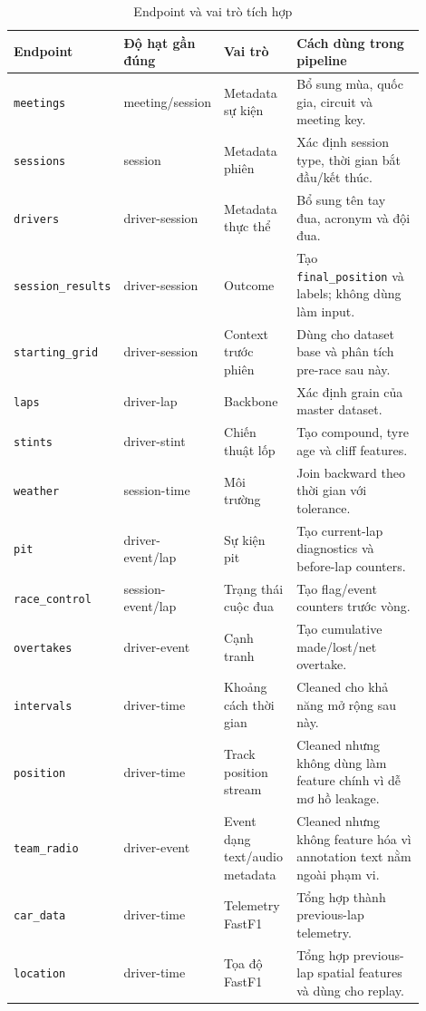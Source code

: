 \documentclass[conference]{IEEEtran}
\begin{document}
\begin{table}[htbp]
\caption{Endpoint và vai trò tích hợp}
\label{tab:endpoints}
\centering
\begin{tabular}{p{0.16\linewidth}p{0.18\linewidth}p{0.18\linewidth}p{0.38\linewidth}}
\toprule
Endpoint & Độ hạt gần đúng & Vai trò & Cách dùng trong pipeline \\
\midrule
\texttt{meetings} & meeting/session & Metadata sự kiện & Bổ sung mùa, quốc gia, circuit và meeting key. \\
\texttt{sessions} & session & Metadata phiên & Xác định session type, thời gian bắt đầu/kết thúc. \\
\texttt{drivers} & driver-session & Metadata thực thể & Bổ sung tên tay đua, acronym và đội đua. \\
\texttt{session\_results} & driver-session & Outcome & Tạo \texttt{final\_position} và labels; không dùng làm input. \\
\texttt{starting\_grid} & driver-session & Context trước phiên & Dùng cho dataset base và phân tích pre-race sau này. \\
\texttt{laps} & driver-lap & Backbone & Xác định grain của master dataset. \\
\texttt{stints} & driver-stint & Chiến thuật lốp & Tạo compound, tyre age và cliff features. \\
\texttt{weather} & session-time & Môi trường & Join backward theo thời gian với tolerance. \\
\texttt{pit} & driver-event/lap & Sự kiện pit & Tạo current-lap diagnostics và before-lap counters. \\
\texttt{race\_control} & session-event/lap & Trạng thái cuộc đua & Tạo flag/event counters trước vòng. \\
\texttt{overtakes} & driver-event & Cạnh tranh & Tạo cumulative made/lost/net overtake. \\
\texttt{intervals} & driver-time & Khoảng cách thời gian & Cleaned cho khả năng mở rộng sau này. \\
\texttt{position} & driver-time & Track position stream & Cleaned nhưng không dùng làm feature chính vì dễ mơ hồ leakage. \\
\texttt{team\_radio} & driver-event & Event dạng text/audio metadata & Cleaned nhưng không feature hóa vì annotation text nằm ngoài phạm vi. \\
\texttt{car\_data} & driver-time & Telemetry FastF1 & Tổng hợp thành previous-lap telemetry. \\
\texttt{location} & driver-time & Tọa độ FastF1 & Tổng hợp previous-lap spatial features và dùng cho replay. \\
\bottomrule
\end{tabular}
\end{table}
\end{document}
